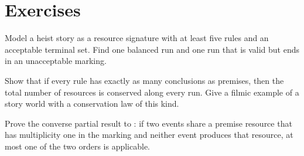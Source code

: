 \section*{Exercises}

\begin{exercise}
Model a heist story as a resource signature with at least five rules and an acceptable terminal set. Find one balanced run and one run that is valid but ends in an unacceptable marking.
\end{exercise}

\begin{exercise}
Show that if every rule has exactly as many conclusions as premises, then the total number of resources is conserved along every run. Give a filmic example of a story world with a conservation law of this kind.
\end{exercise}

\begin{exercise}
Prove the converse partial result to : if two events share a premise resource that has multiplicity one in the marking and neither event produces that resource, at most one of the two orders is applicable.
\end{exercise}
